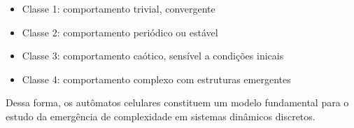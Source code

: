 \begin{itemize}
    \item Classe 1: comportamento trivial, convergente
    \item Classe 2: comportamento periódico ou estável
    \item Classe 3: comportamento caótico, sensível a condições inicais
    \item Classe 4: comportamento complexo com estruturas emergentes
\end{itemize}

Dessa forma, os autômatos celulares constituem um modelo fundamental para o estudo da emergência de complexidade em sistemas dinâmicos discretos.